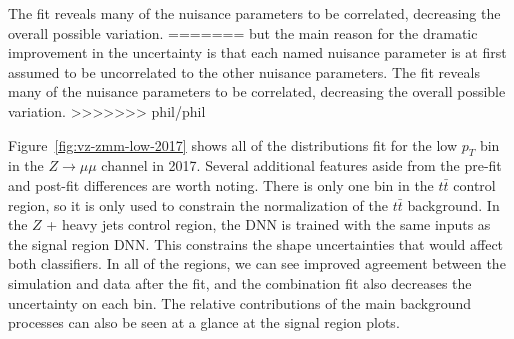 The fit reveals many of the nuisance parameters to be correlated, decreasing the overall possible variation.
=======
but the main reason for the dramatic improvement in the uncertainty is that each named nuisance parameter is at first
assumed to be uncorrelated to the other nuisance parameters. 
The fit reveals many of the nuisance parameters to be correlated,
decreasing the overall possible variation. 
>>>>>>> phil/phil

Figure~\ref{fig:vz-zmm-low-2017} shows all of the distributions fit for the low $p_T$ bin in the
$Z\rightarrow\mu\mu$ channel in 2017.
Several additional features aside from the pre-fit and post-fit differences are worth noting.
There is only one bin in the $t\bar{t}$ control region,
so it is only used to constrain the normalization of the $t\bar{t}$ background.
In the $Z$ + heavy jets control region, the DNN is trained with the same inputs as the signal region DNN.
This constrains the shape uncertainties that would affect both classifiers.
In all of the regions, we can see improved agreement between the simulation and data after the fit, and
the combination fit also decreases the uncertainty on each bin.
The relative contributions of the main background processes can also be seen at a glance at the signal region plots.
%
